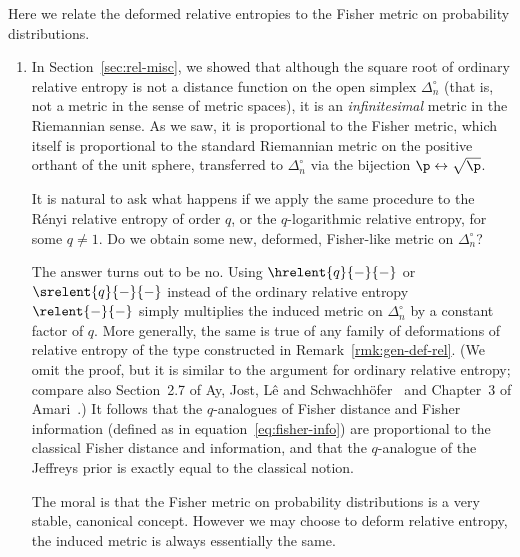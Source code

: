 \begin{remarks}
Here we relate the deformed relative entropies to the
Fisher%
%
% 
metric on probability distributions.
% 
\begin{enumerate}
\item
{}
% 
In Section~\ref{sec:rel-misc}, we showed that although the square root of
ordinary relative entropy is not a distance function on the open simplex
$\Delta_n^\circ$ (that is, not a metric in the sense of metric spaces), it
is an \emph{infinitesimal} metric in the Riemannian sense.  As we saw, it
is proportional to the Fisher metric, which itself is proportional to the
standard Riemannian metric on the positive orthant of the unit sphere,
transferred to $\Delta_n^\circ$ via the bijection $\p \leftrightarrow
\sqrt{\p}$.

It is natural to ask what happens if we apply the same procedure to the
R\'enyi relative entropy of order $q$, or the $q$-logarithmic relative
entropy, for some $q \neq 1$.  Do we obtain some new, deformed, Fisher-like
metric on $\Delta_n^\circ$?

The answer turns out to be no.  Using $\hrelent{q}{-}{-}$ or
$\srelent{q}{-}{-}$ instead of the ordinary relative entropy
$\relent{-}{-}$ simply multiplies the induced metric on $\Delta_n^\circ$ by
a constant factor of $q$.  More generally, the same is true of any family
of deformations of relative entropy of the type constructed in
Remark~\ref{rmk:gen-def-rel}. 
(We omit the proof, but it is similar to the argument for ordinary relative
entropy; compare also Section~2.7 of Ay, Jost, L{\^e} and
Schwachh{\"o}fer~\cite{AJLS} and Chapter~3 of Amari~\cite{AmarIGA}.)
It follows that the $q$-analogues of
Fisher%
%
%
distance and Fisher%
%
%
information (defined as in equation~\eqref{eq:fisher-info}) are
proportional to the classical Fisher distance and information, and that the
$q$-analogue of the Jeffreys%
%
% 
prior is exactly equal to the classical notion.

The moral is that the Fisher metric on probability distributions is a very
stable, canonical concept.  However we may choose to deform relative
entropy, the induced metric is always essentially the same.


\end{enumerate}
\end{remarks}
